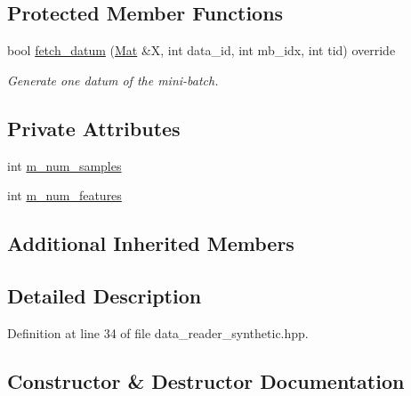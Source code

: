 \subsection*{Protected Member Functions}
\begin{DoxyCompactItemize}
\item 
bool \hyperlink{classlbann_1_1data__reader__synthetic_af90ce15d2c6f30a921ffa54ee5547565}{fetch\+\_\+datum} (\hyperlink{base_8hpp_a68f11fdc31b62516cb310831bbe54d73}{Mat} \&X, int data\+\_\+id, int mb\+\_\+idx, int tid) override
\begin{DoxyCompactList}\small\item\em Generate one datum of the mini-\/batch. \end{DoxyCompactList}\end{DoxyCompactItemize}
\subsection*{Private Attributes}
\begin{DoxyCompactItemize}
\item 
int \hyperlink{classlbann_1_1data__reader__synthetic_aa71d4bc62be7cf93eb6e85abf82d6b1f}{m\+\_\+num\+\_\+samples}
\item 
int \hyperlink{classlbann_1_1data__reader__synthetic_a18f0ba6014a0f1edec24c7c3c109c520}{m\+\_\+num\+\_\+features}
\end{DoxyCompactItemize}
\subsection*{Additional Inherited Members}


\subsection{Detailed Description}


Definition at line 34 of file data\+\_\+reader\+\_\+synthetic.\+hpp.



\subsection{Constructor \& Destructor Documentation}
\mbox{\label{classlbann_1_1data__reader__synthetic_a9d1cf28b223c11e4fdc776b0d364685d}} 
